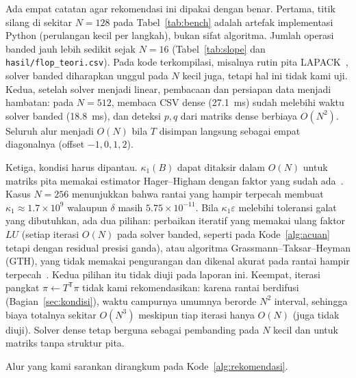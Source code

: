 \documentclass[12pt,a4paper]{article}
\newcommand{\T}{\mathsf{T}}
\numberwithin{equation}{section}
\begin{document}
Ada empat catatan agar rekomendasi ini dipakai dengan benar. Pertama, titik silang di sekitar $N=128$ pada
Tabel~\ref{tab:bench} adalah artefak implementasi Python (perulangan kecil per langkah), bukan sifat algoritma. Jumlah
operasi banded jauh lebih sedikit sejak $N=16$ (Tabel~\ref{tab:slope} dan \texttt{hasil/flop\_teori.csv}). Pada kode
terkompilasi, misalnya rutin pita LAPACK~\cite{lapack}, solver banded diharapkan unggul pada $N$ kecil juga, tetapi hal ini
tidak kami uji. Kedua, setelah solver menjadi linear, pembacaan dan persiapan data menjadi hambatan: pada $N=512$,
membaca CSV dense (27.1~ms) sudah melebihi waktu solver banded (18.8~ms), dan deteksi $p,q$ dari matriks dense berbiaya
$O(N^2)$. Seluruh alur menjadi $O(N)$ bila $T$ disimpan langsung sebagai empat diagonalnya (offset $-1,0,1,2$).

Ketiga, kondisi harus dipantau. $\kappa_1(B)$ dapat ditaksir dalam $O(N)$ untuk matriks pita memakai estimator
Hager--Higham dengan faktor yang sudah ada~\cite{higham}. Kasus $N=256$ menunjukkan bahwa rantai yang hampir terpecah
membuat $\kappa_1\approx1.7\times10^{9}$ walaupun $\delta$ masih $5.75\times10^{-11}$. Bila $\kappa_1\varepsilon$ melebihi
toleransi galat yang dibutuhkan, ada dua pilihan: perbaikan iteratif yang memakai ulang faktor $LU$ (setiap iterasi
$O(N)$ pada solver banded, seperti pada Kode~\ref{alg:acuan} tetapi dengan residual presisi ganda), atau algoritma
Grassmann--Taksar--Heyman (GTH), yang tidak memakai pengurangan dan dikenal akurat pada rantai hampir terpecah~\cite{gth}.
Kedua pilihan itu tidak diuji pada laporan ini. Keempat, iterasi pangkat $\pi\leftarrow T^\T\pi$ tidak kami
rekomendasikan: karena rantai berdifusi (Bagian~\ref{sec:kondisi}), waktu campurnya umumnya berorde $N^2$ interval,
sehingga biaya totalnya sekitar $O(N^3)$ meskipun tiap iterasi hanya $O(N)$ (juga tidak diuji). Solver dense tetap
berguna sebagai pembanding pada $N$ kecil dan untuk matriks tanpa struktur pita.

Alur yang kami sarankan dirangkum pada Kode~\ref{alg:rekomendasi}.
\end{document}
